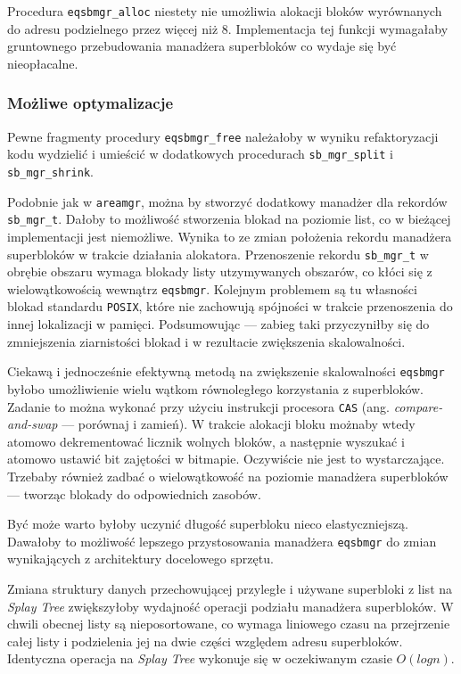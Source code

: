 \documentclass[12pt,a4paper,titlepage,twoside]{mwart}
\begin{document}
Procedura \verb+eqsbmgr_alloc+ niestety nie umożliwia alokacji bloków
wyrównanych do adresu podzielnego przez więcej niż 8. Implementacja tej funkcji
wymagałaby gruntownego przebudowania manadżera superbloków co wydaje się być
nieopłacalne.

\subsubsection{Możliwe optymalizacje}

Pewne fragmenty procedury \verb+eqsbmgr_free+ należałoby w wyniku
refaktoryzacji kodu wydzielić i umieścić w dodatkowych procedurach
\verb+sb_mgr_split+ i \verb+sb_mgr_shrink+.

Podobnie jak w \texttt{areamgr}, można by stworzyć dodatkowy manadżer dla
rekordów \verb+sb_mgr_t+. Dałoby to możliwość stworzenia blokad na poziomie
list, co w bieżącej implementacji jest niemożliwe. Wynika to ze zmian
położenia rekordu manadżera superbloków w trakcie działania alokatora.
Przenoszenie rekordu \verb+sb_mgr_t+ w obrębie obszaru wymaga blokady listy
utzymywanych obszarów, co kłóci się z wielowątkowością wewnątrz
\texttt{eqsbmgr}. Kolejnym problemem są tu własności blokad standardu
\texttt{POSIX}, które nie zachowują spójności w trakcie przenoszenia do innej
lokalizacji w pamięci. Podsumowując --- zabieg taki przyczyniłby się do
zmniejszenia ziarnistości blokad i w rezultacie zwiększenia skalowalności.

Ciekawą i jednocześnie efektywną metodą na zwiększenie skalowalności
\texttt{eqsbmgr} byłobo umożliwienie wielu wątkom równoległego korzystania z
superbloków.  Zadanie to można wykonać przy użyciu instrukcji procesora
\verb+CAS+ (ang. \textit{compare-and-swap} --- porównaj i zamień).  W trakcie
alokacji bloku możnaby wtedy atomowo dekrementować licznik wolnych bloków, a
następnie wyszukać i atomowo ustawić bit zajętości w bitmapie. Oczywiście nie
jest to wystarczające. Trzebaby również zadbać o wielowątkowość na poziomie
manadżera superbloków --- tworząc blokady do odpowiednich zasobów.

Być może warto byłoby uczynić długość superbloku nieco elastyczniejszą.
Dawałoby to możliwość lepszego przystosowania manadżera \texttt{eqsbmgr} do
zmian wynikających z architektury docelowego sprzętu.

Zmiana struktury danych przechowującej przyległe i używane superbloki z list na
\textit{Splay Tree} zwiększyłoby wydajność operacji podziału manadżera
superbloków. W chwili obecnej listy są nieposortowane, co wymaga liniowego
czasu na przejrzenie całej listy i podzielenia jej na dwie części względem
adresu superbloków. Identyczna operacja na \textit{Splay Tree} wykonuje się w
oczekiwanym czasie $O(log n)$.
\end{document}
